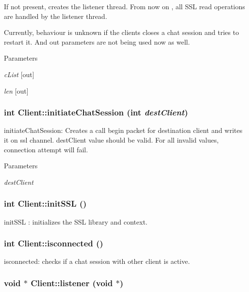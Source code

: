 If not present, creates the listener thread. From now on , all SSL read operations are handled by the listener thread. 

Currently, behaviour is unknown if the clients closes a chat session and tries to restart it. And out parameters are not being used now as well.


\begin{DoxyParams}{Parameters}
\item[{\em cList}]\mbox{[}out\mbox{]} \item[{\em len}]\mbox{[}out\mbox{]} \end{DoxyParams}
\hypertarget{classClient_aca02d554e100a27ca0c2ae3b22d74f8b}{
\subsubsection[{initiateChatSession}]{\setlength{\rightskip}{0pt plus 5cm}int Client::initiateChatSession (int {\em destClient})}}
\label{classClient_aca02d554e100a27ca0c2ae3b22d74f8b}
initiateChatSession: Creates a call begin packet for destination client and writes it on ssl channel. destClient value should be valid. For all invalid values, connection attempt will fail. 
\begin{DoxyParams}{Parameters}
\item[{\em destClient}]\end{DoxyParams}
\hypertarget{classClient_a0b3c7c10e9d82c0f5f41ee8f0d68f1b4}{
\subsubsection[{initSSL}]{\setlength{\rightskip}{0pt plus 5cm}int Client::initSSL ()}}
\label{classClient_a0b3c7c10e9d82c0f5f41ee8f0d68f1b4}
initSSL : initializes the SSL library and context. \hypertarget{classClient_ac73e9b5525ca9927ed90e83e9ebe4c15}{
\subsubsection[{isconnected}]{\setlength{\rightskip}{0pt plus 5cm}int Client::isconnected ()}}
\label{classClient_ac73e9b5525ca9927ed90e83e9ebe4c15}
isconnected: checks if a chat session with other client is active. \hypertarget{classClient_a7b83f2c7c0dfdd9022caab642c5f2d7f}{
\subsubsection[{listener}]{\setlength{\rightskip}{0pt plus 5cm}void $\ast$ Client::listener (void $\ast$)}}
